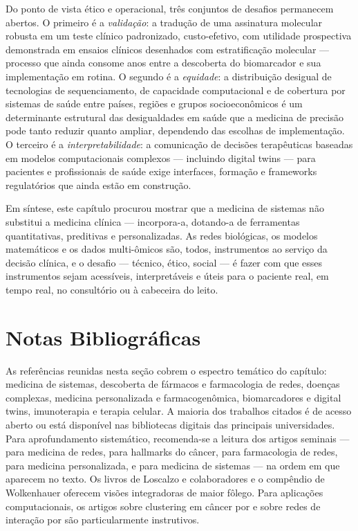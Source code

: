 Do ponto de vista ético e operacional, três conjuntos de desafios permanecem abertos. O primeiro é a \emph{validação}: a tradução de uma assinatura molecular robusta em um teste clínico padronizado, custo-efetivo, com utilidade prospectiva demonstrada em ensaios clínicos desenhados com estratificação molecular --- processo que ainda consome anos entre a descoberta do biomarcador e sua implementação em rotina. O segundo é a \emph{equidade}: a distribuição desigual de tecnologias de sequenciamento, de capacidade computacional e de cobertura por sistemas de saúde entre países, regiões e grupos socioeconômicos é um determinante estrutural das desigualdades em saúde que a medicina de precisão pode tanto reduzir quanto ampliar, dependendo das escolhas de implementação. O terceiro é a \emph{interpretabilidade}: a comunicação de decisões terapêuticas baseadas em modelos computacionais complexos --- incluindo digital twins --- para pacientes e profissionais de saúde exige interfaces, formação e frameworks regulatórios que ainda estão em construção.

Em síntese, este capítulo procurou mostrar que a medicina de sistemas não substitui a medicina clínica --- incorpora-a, dotando-a de ferramentas quantitativas, preditivas e personalizadas. As redes biológicas, os modelos matemáticos e os dados multi-ômicos são, todos, instrumentos ao serviço da decisão clínica, e o desafio --- técnico, ético, social --- é fazer com que esses instrumentos sejam acessíveis, interpretáveis e úteis para o paciente real, em tempo real, no consultório ou à cabeceira do leito.

\section{Notas Bibliográficas}
\label{sec:13-referencias}

{As referências reunidas nesta seção cobrem o espectro temático do capítulo: medicina de sistemas, descoberta de fármacos e farmacologia de redes, doenças complexas, medicina personalizada e farmacogenômica, biomarcadores e digital twins, imunoterapia e terapia celular. A maioria dos trabalhos citados é de acesso aberto ou está disponível nas bibliotecas digitais das principais universidades. Para aprofundamento sistemático, recomenda-se a leitura dos artigos seminais --- \cite{barabasi2011} para medicina de redes, \cite{hanahan2011} para hallmarks do câncer, \cite{hopkins2008} para farmacologia de redes, \cite{ashley2016} para medicina personalizada, e \cite{auffray2009} para medicina de sistemas --- na ordem em que aparecem no texto. Os livros de Loscalzo e colaboradores e o compêndio de Wolkenhauer oferecem visões integradoras de maior fôlego. Para aplicações computacionais, os artigos sobre clustering em câncer por \cite{brunet2004} e sobre redes de interação por \cite{menche2015} são particularmente instrutivos.

}

